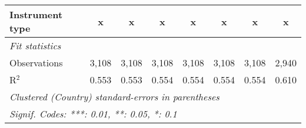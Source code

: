 \begin{table}[htbp]
\begin{tabular}{lccccccc}
      Instrument type                                                          & x             & x             & x             & x             & x             & x             & x\\  
      \midrule \emph{Fit statistics}\\
      Observations                                                             & 3,108         & 3,108         & 3,108         & 3,108         & 3,108         & 3,108         & 2,940\\  
      R$^2$                                                                    & 0.553         & 0.553         & 0.554         & 0.554         & 0.554         & 0.554         & 0.610\\  
      \midrule
      \multicolumn{8}{l}{\emph{Clustered (Country) standard-errors in parentheses}}\\
      \multicolumn{8}{l}{\emph{Signif. Codes: ***: 0.01, **: 0.05, *: 0.1}}\\
   \end{tabular}
\end{table}


